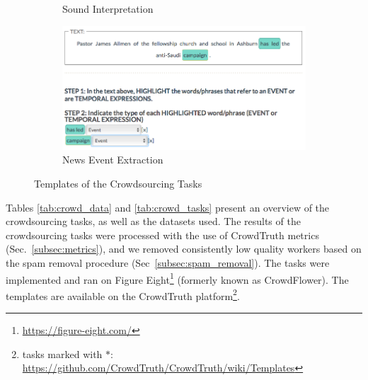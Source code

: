 \begin{figure}[!tb]
\begin{subfigure}{.5\textwidth}
\caption{Sound Interpretation}
\label{fig:screenshot_sounds}
\end{subfigure}%
\begin{subfigure}{.5\textwidth}
\includegraphics[width=\linewidth]{img/news_event_extraction.png}
\caption{News Event Extraction}
\label{fig:screenshot_news}
\end{subfigure}
\caption{Templates of the Crowdsourcing Tasks}
\end{figure}


Tables \ref{tab:crowd_data} and \ref{tab:crowd_tasks} present an overview of the crowdsourcing tasks, as well as the datasets used. The results of the crowdsourcing tasks were processed with the use of CrowdTruth metrics (Sec.~\ref{subsec:metrics}), and we removed consistently low quality workers based on the spam removal procedure (Sec~\ref{subsec:spam_removal}). The tasks were implemented and ran on Figure Eight\footnote{\url{https://figure-eight.com/}} (formerly known as CrowdFlower). The templates are available on the CrowdTruth platform\footnote{tasks marked with $*$: \url{https://github.com/CrowdTruth/CrowdTruth/wiki/Templates}}.

\begin{table}[!htp]
	\caption{Crowdsourcing Task Data}
    \label{tab:crowd_tasks}
\end{table}

